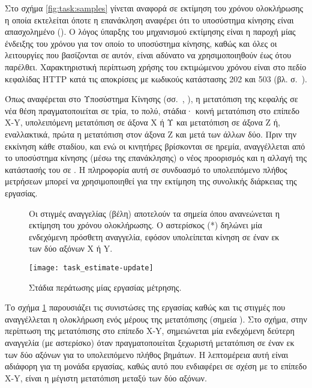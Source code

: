 Στο σχήμα \ref{fig:task:samples} γίνεται αναφορά σε εκτίμηση του χρόνου
ολοκλήρωσης η οποία εκτελείται όποτε η επανάκληση αναφέρει ότι το υποσύστημα
κίνησης είναι απασχολημένο (). Ο λόγος ύπαρξης του μηχανισμού εκτίμησης
είναι η
παροχή μίας ένδειξης του χρόνου για τον οποίο το υποσύστημα κίνησης, καθώς και
όλες οι λειτουργίες που βασίζονται σε αυτόν, είναι αδύνατο να χρησιμοποιηθούν
έως ότου παρέλθει. Χαρακτηριστική περίπτωση χρήσης του εκτιμώμενου χρόνου είναι
στο πεδίο κεφαλίδας HTTP  κατά τις αποκρίσεις με κωδικούς
κατάστασης 202 και 503 (βλ. 
σ.~\pageref{sec:network:impl-resources}).

Όπως αναφέρεται στο Υποσύστημα Κίνησης
(σσ.~\pageref{ssubsec:motor:routing},%
\pageref{ssubsec:motor:common-translation}),
η μετατόπιση της κεφαλής σε νέα θέση πραγματοποιείται σε τρία, το πολύ, στάδια·
κοινή μετατόπιση στο επίπεδο X-Y, υπολειπόμενη μετατόπιση σε άξονα X ή Υ και
μετατόπιση σε άξονα Z ή, εναλλακτικά, πρώτα η μετατόπιση στον άξονα Z και μετά
των άλλων δύο. Πριν την εκκίνηση κάθε σταδίου, και ενώ οι κινητήρες
βρίσκονται σε ηρεμία, αναγγέλλεται από το υποσύστημα κίνησης (μέσω της
επανάκλησης) ο νέος προορισμός και η αλλαγή της κατάστασής του σε . Η
πληροφορία αυτή σε συνδυασμό το υπολειπόμενο πλήθος μετρήσεων μπορεί να
χρησιμοποιηθεί για την εκτίμηση της συνολικής διάρκειας της εργασίας.

\begin{figure}
    \caption{Στάδια περάτωσης μίας εργασίας μέτρησης.
    \label{fig:task:estimate-update}}
    Οι στιγμές αναγγελίας  (βέλη) αποτελούν τα σημεία όπου ανανεώνεται
    η εκτίμηση του χρόνου ολοκλήρωσης. Ο αστερίσκος (*) δηλώνει μία ενδεχόμενη
    πρόσθετη αναγγελία, εφόσον υπολείπεται κίνηση σε έναν εκ των δύο αξόνων X ή
    Y.
    \begin{center}
    \texttt{[image: task\_estimate-update]}
    \end{center}
\end{figure}

Το σχήμα \ref{fig:task:estimate-update} παρουσιάζει τις συνιστώσες της εργασίας
καθώς και τις στιγμές που αναγγέλλεται η ολοκλήρωση ενός μέρους της μετατόπισης
(σημεία ). Στο σχήμα, στην περίπτωση της μετατόπισης στο επίπεδο X-Y,
σημειώνεται μία ενδεχόμενη δεύτερη αναγγελία (με αστερίσκο) όταν
πραγματοποιείται ξεχωριστή μετατόπιση σε έναν εκ των δύο αξόνων για το
υπολειπόμενο πλήθος βημάτων. Η λεπτομέρεια αυτή είναι αδιάφορη για τη μονάδα
εργασίας, καθώς αυτό που ενδιαφέρει σε σχέση με το επίπεδο X-Y, είναι η μέγιστη
μετατόπιση μεταξύ των δύο αξόνων.

